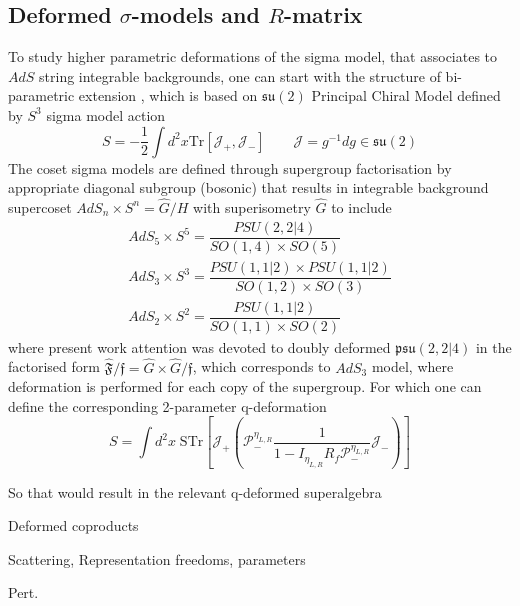 \documentclass[12pt,a4paper]{article}
\numberwithin{equation}{section}
\newcommand{\alg}[1]{\mathfrak{#1}}
\begin{document}
\subsection{Deformed $ \sigma $-models and $ R $-matrix}\label{2-def SM}
To study higher parametric deformations of the sigma model, that associates to $ AdS $ string integrable backgrounds, one can start with the structure of bi-parametric extension \cite{Klimcik:2008eq,Klim_k_2014}, which is based on $ \alg{su}(2) $ Principal Chiral Model defined by $ S^{3} $ sigma model action
\begin{equation}
	S = -\dfrac{1}{2} \int d^{2}x \text{Tr}\left[ \mathcal{J}_{+}, \mathcal{J}_{-} \right] \qquad \mathcal{J} = g^{-1}dg \in \alg{su}(2)
\end{equation}
The coset sigma models are defined through supergroup factorisation by appropriate diagonal subgroup (bosonic) that results in integrable background supercoset $ AdS_{n} \times S^{n} = \hat{G}/H $ with superisometry $ \hat{G} $ to include
\begin{align}\label{key}
	AdS_{5} \times S^{5} = \dfrac{PSU(2,2\vert4)}{SO(1,4) \times SO(5)} \\
	AdS_{3} \times S^{3} = \dfrac{PSU(1,1\vert2) \times PSU(1,1\vert2)}{SO(1,2) \times SO(3)}  \\
	AdS_{2} \times S^{2} = \dfrac{PSU(1,1\vert2)}{SO(1,1) \times SO(2)} 
\end{align}
where present work attention was devoted to doubly deformed $ \alg{psu}(2,2 \vert 4) $ in the factorised form $ \hat{\mathfrak{F}}/\mathfrak{f} = \hat{G} \times \hat{G} / \mathfrak{f} $, which corresponds to $ AdS_{3} $ model, where deformation is performed for each copy of the supergroup. For which one can define the corresponding 2-parameter q-deformation \cite{Hoare:2014oua}
\begin{equation}\label{key}
	S = \int d^{2}x \; \text{STr} \left[ \mathcal{J}_{+} \left( \mathcal{P}_{-}^{\eta_{L,R}} \dfrac{1}{1-I_{\eta_{L,R}} R_{f} \mathcal{P}_{-}^{\eta_{L,R}}} \mathcal{J}_{-} \right) \right]
\end{equation}

So that would result in the relevant q-deformed superalgebra


\vspace*{10mm}
Deformed coproducts

\vspace*{10mm}
Scattering, Representation freedoms, parameters

\vspace*{10mm}
Pert.


\pagebreak

\fi



\end{document}
